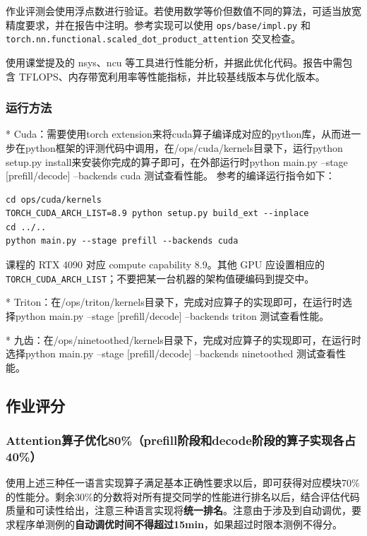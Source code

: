 \documentclass{article}
\begin{document}
作业评测会使用浮点数进行验证。若使用数学等价但数值不同的算法，可适当放宽精度要求，并在报告中注明。参考实现可以使用 \texttt{ops/base/impl.py} 和
\texttt{torch.nn.functional.scaled_dot_product_attention}\cite{pytorchsdpa} 交叉检查。


使用课堂提及的 nsys、ncu 等工具进行性能分析，并据此优化代码。报告中需包含 TFLOPS、内存带宽利用率等性能指标，并比较基线版本与优化版本。

\subsubsection{运行方法}

* Cuda：需要使用torch extension来将cuda算子编译成对应的python库，从而进一步在python框架的评测代码中调用，在/ops/cuda/kernels目录下，运行python setup.py install来安装你完成的算子即可，在外部运行时python main.py --stage [prefill/decode] --backends cuda 测试查看性能。
参考的编译运行指令如下：\begin{verbatim}
cd ops/cuda/kernels
TORCH_CUDA_ARCH_LIST=8.9 python setup.py build_ext --inplace
cd ../..
python main.py --stage prefill --backends cuda
\end{verbatim}

课程的 RTX 4090 对应 compute capability 8.9。其他 GPU 应设置相应的
\texttt{TORCH\_CUDA\_ARCH\_LIST}；不要把某一台机器的架构值硬编码到提交中。

* Triton：在/ops/triton/kernels目录下，完成对应算子的实现即可，在运行时选择python main.py --stage [prefill/decode] --backends triton 测试查看性能。

* 九齿：在/ops/ninetoothed/kernels目录下，完成对应算子的实现即可，在运行时选择python main.py --stage [prefill/decode] --backends ninetoothed 测试查看性能。

\subsection{作业评分}

\subsubsection{Attention算子优化80\%（prefill阶段和decode阶段的算子实现各占40\%）}
使用上述三种任一语言实现算子满足基本正确性要求以后，即可获得对应模块70\%的性能分。剩余30\%的分数将对所有提交同学的性能进行排名以后，结合评估代码质量和可读性给出，注意三种语言实现将\textbf{统一排名}。注意由于涉及到自动调优，要求程序单测例的\textbf{自动调优时间不得超过15min}，如果超过时限本测例不得分。
\end{document}
